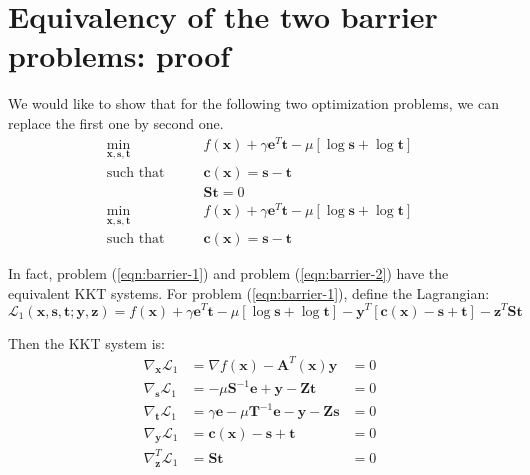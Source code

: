 \documentclass[12pt]{article}
\newcommand{\mb}{\mathbf}
\begin{document}
\section{Equivalency of the two barrier problems: proof}
\label{section:proof}
We would like to show that for the following two optimization problems, we can replace the first one by second one.
%
\begin{equation}
  \label{eqn:barrier-1}
  \begin{aligned}
    \min_{\mb{x}, \mb{s}, \mb{t}} \qquad & f(\mb{x}) + \gamma \mb{e}^T \mb{t} - \mu [\log \mb{s} + \log \mb{t} ] \\
    \text{such that} \qquad
    & \mb{c}(\mb{x}) = \mb{s} - \mb{t} \\
    & \mb{S} \mb{t} = 0
  \end{aligned}
\end{equation}
%
\begin{equation}
  \label{eqn:barrier-2}
  \begin{aligned}
    \min_{\mb{x}, \mb{s}, \mb{t}} \qquad & f(\mb{x}) + \gamma \mb{e}^T \mb{t} - \mu [\log \mb{s} + \log \mb{t} ] \\
    \text{such that} \qquad
    & \mb{c}(\mb{x}) = \mb{s} - \mb{t}
  \end{aligned}
\end{equation}

In fact, problem (\ref{eqn:barrier-1}) and problem (\ref{eqn:barrier-2}) have the equivalent KKT systems. For problem (\ref{eqn:barrier-1}), define the Lagrangian:
%
\begin{equation}
\mathcal{L}_1(\mb{x}, \mb{s}, \mb{t}; \mb{y}, \mb{z}) = f(\mb{x}) + \gamma \mb{e}^T \mb{t} - \mu [\log \mb{s} + \log \mb{t} ] - \mb{y}^T [\mb{c}(\mb{x}) - \mb{s} + \mb{t}] - \mb{z}^T \mb{S} \mb{t}
\end{equation}

Then the KKT system is:
%
\begin{equation}
  \label{eqn:KKT-1}
  \begin{aligned}
    \nabla_\mb{x}\mathcal{L}_1 &= \nabla f(\mb{x}) - \mb{A}^T(\mb{x}) \mb{y} &= 0\\
    \nabla_\mb{s}\mathcal{L}_1 &= - \mu \mb{S}^{-1}\mb{e} + \mb{y} - \mb{Z} \mb{t} &=  0\\
    \nabla_\mb{t}\mathcal{L}_1 &= \gamma \mb{e} - \mu \mb{T}^{-1} \mb{e} - \mb{y} - \mb{Z} \mb{s} &= 0 \\
    \nabla_\mb{y}\mathcal{L}_1 &= \mb{c}(\mb{x}) - \mb{s} + \mb{t} &= 0\\
    \nabla_\mb{z}^T\mathcal{L}_1 &= \mb{S} \mb{t} &= 0
  \end{aligned}
\end{equation}
\end{document}
